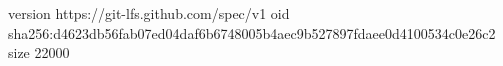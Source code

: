 version https://git-lfs.github.com/spec/v1
oid sha256:d4623db56fab07ed04daf6b6748005b4aec9b527897fdaee0d4100534c0e26c2
size 22000
